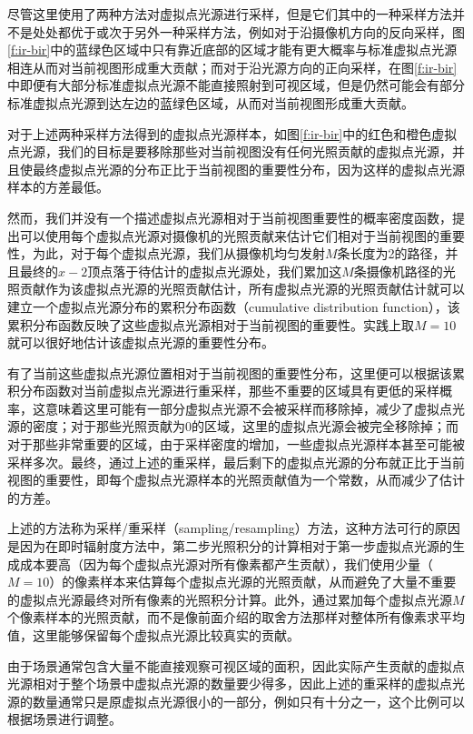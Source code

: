 尽管这里使用了两种方法对虚拟点光源进行采样，但是它们其中的一种采样方法并不是处处都优于或次于另外一种采样方法，例如对于沿摄像机方向的反向采样，图\ref{f:ir-bir}中的蓝绿色区域中只有靠近底部的区域才能有更大概率与标准虚拟点光源相连从而对当前视图形成重大贡献；而对于沿光源方向的正向采样，在图\ref{f:ir-bir}中即便有大部分标准虚拟点光源不能直接照射到可视区域，但是仍然可能会有部分标准虚拟点光源到达左边的蓝绿色区域，从而对当前视图形成重大贡献。

对于上述两种采样方法得到的虚拟点光源样本，如图\ref{f:ir-bir}中的红色和橙色虚拟点光源，我们的目标是要移除那些对当前视图没有任何光照贡献的虚拟点光源，并且使最终虚拟点光源的分布正比于当前视图的重要性分布，因为这样的虚拟点光源样本的方差最低。

然而，我们并没有一个描述虚拟点光源相对于当前视图重要性的概率密度函数，\cite{a:BidirectionalInstantRadiosity}提出可以使用每个虚拟点光源对摄像机的光照贡献来估计它们相对于当前视图的重要性，为此，对于每个虚拟点光源，我们从摄像机均匀发射$M$条长度为2的路径，并且最终的$x-2$顶点落于待估计的虚拟点光源处，我们累加这$M$条摄像机路径的光照贡献作为该虚拟点光源的光照贡献估计，所有虚拟点光源的光照贡献估计就可以建立一个虚拟点光源分布的累积分布函数（cumulative distribution function），该累积分布函数反映了这些虚拟点光源相对于当前视图的重要性。实践上取$M=10$就可以很好地估计该虚拟点光源的重要性分布。

有了当前这些虚拟点光源位置相对于当前视图的重要性分布，这里便可以根据该累积分布函数对当前虚拟点光源进行重采样，那些不重要的区域具有更低的采样概率，这意味着这里可能有一部分虚拟点光源不会被采样而移除掉，减少了虚拟点光源的密度；对于那些光照贡献为0的区域，这里的虚拟点光源会被完全移除掉；而对于那些非常重要的区域，由于采样密度的增加，一些虚拟点光源样本甚至可能被采样多次。最终，通过上述的重采样，最后剩下的虚拟点光源的分布就正比于当前视图的重要性，即每个虚拟点光源样本的光照贡献值为一个常数，从而减少了估计的方差。

上述的方法称为采样/重采样（sampling/resampling）方法，这种方法可行的原因是因为在即时辐射度方法中，第二步光照积分的计算相对于第一步虚拟点光源的生成成本要高（因为每个虚拟点光源对所有像素都产生贡献），我们使用少量（$M=10$）的像素样本来估算每个虚拟点光源的光照贡献，从而避免了大量不重要的虚拟点光源最终对所有像素的光照积分计算。此外，通过累加每个虚拟点光源$M$个像素样本的光照贡献，而不是像前面介绍的取舍方法那样对整体所有像素求平均值，这里能够保留每个虚拟点光源比较真实的贡献。

由于场景通常包含大量不能直接观察可视区域的面积，因此实际产生贡献的虚拟点光源相对于整个场景中虚拟点光源的数量要少得多，因此上述的重采样的虚拟点光源的数量通常只是原虚拟点光源很小的一部分，例如只有十分之一，这个比例可以根据场景进行调整。




